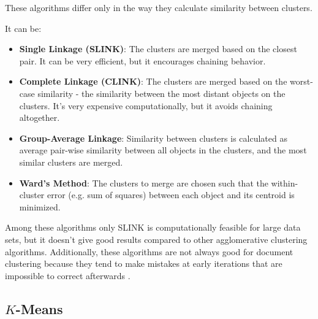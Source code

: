 These algorithms differ only in the way they calculate 
similarity between clusters. 

It can be: 

\begin{itemize}
\itemsep1pt\parskip0pt
  \item \textbf{Single Linkage (SLINK)}: The clusters are merged based
on the closest pair. It can be very efficient, but it encourages 
chaining behavior.


  \item \textbf{Complete Linkage (CLINK)}: The clusters are merged 
  based on the worst-case similarity - the similarity between the most 
  distant objects on the clusters. It's very expensive computationally, 
  but it avoids chaining altogether. 


  \item \textbf{Group-Average Linkage}: Similarity between clusters 
  is calculated as average pair-wise similarity between all objects 
  in the clusters, and the most similar clusters are merged.

  \item \textbf{Ward's Method}: The clusters to merge are chosen such that the within-cluster
  error (e.g. sum of squares) between each object and its centroid 
  is minimized. 


\end{itemize}


Among these algorithms only SLINK is computationally feasible 
for large data sets, but it doesn't give good results compared to other 
agglomerative clustering algorithms. Additionally, these algorithms 
are not always good for document clustering because they tend to 
make mistakes at early iterations that are impossible to correct
afterwards \cite{steinbach2000comparison}.



\subsection{$K$-Means} \label{sec:kmeans}

